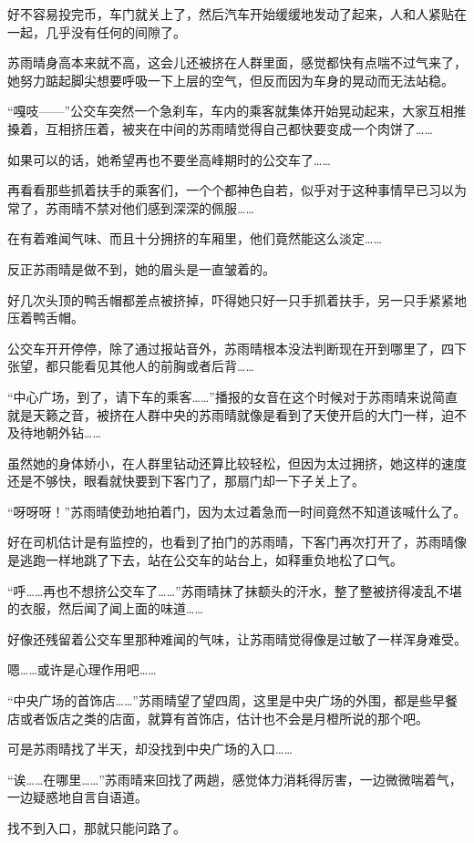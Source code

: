 好不容易投完币，车门就关上了，然后汽车开始缓缓地发动了起来，人和人紧贴在一起，几乎没有任何的间隙了。

苏雨晴身高本来就不高，这会儿还被挤在人群里面，感觉都快有点喘不过气来了，她努力踮起脚尖想要呼吸一下上层的空气，但反而因为车身的晃动而无法站稳。

“嘎吱——”公交车突然一个急刹车，车内的乘客就集体开始晃动起来，大家互相推搡着，互相挤压着，被夹在中间的苏雨晴觉得自己都快要变成一个肉饼了……

如果可以的话，她希望再也不要坐高峰期时的公交车了……

再看看那些抓着扶手的乘客们，一个个都神色自若，似乎对于这种事情早已习以为常了，苏雨晴不禁对他们感到深深的佩服……

在有着难闻气味、而且十分拥挤的车厢里，他们竟然能这么淡定……

反正苏雨晴是做不到，她的眉头是一直皱着的。

好几次头顶的鸭舌帽都差点被挤掉，吓得她只好一只手抓着扶手，另一只手紧紧地压着鸭舌帽。

公交车开开停停，除了通过报站音外，苏雨晴根本没法判断现在开到哪里了，四下张望，都只能看见其他人的前胸或者后背……

“中心广场，到了，请下车的乘客……”播报的女音在这个时候对于苏雨晴来说简直就是天籁之音，被挤在人群中央的苏雨晴就像是看到了天使开启的大门一样，迫不及待地朝外钻……

虽然她的身体娇小，在人群里钻动还算比较轻松，但因为太过拥挤，她这样的速度还是不够快，眼看就快要到下客门了，那扇门却一下子关上了。

“呀呀呀！”苏雨晴使劲地拍着门，因为太过着急而一时间竟然不知道该喊什么了。

好在司机估计是有监控的，也看到了拍门的苏雨晴，下客门再次打开了，苏雨晴像是逃跑一样地跳了下去，站在公交车的站台上，如释重负地松了口气。

“呼……再也不想挤公交车了……”苏雨晴抹了抹额头的汗水，整了整被挤得凌乱不堪的衣服，然后闻了闻上面的味道……

好像还残留着公交车里那种难闻的气味，让苏雨晴觉得像是过敏了一样浑身难受。

嗯……或许是心理作用吧……

“中央广场的首饰店……”苏雨晴望了望四周，这里是中央广场的外围，都是些早餐店或者饭店之类的店面，就算有首饰店，估计也不会是月橙所说的那个吧。

可是苏雨晴找了半天，却没找到中央广场的入口……

“诶……在哪里……”苏雨晴来回找了两趟，感觉体力消耗得厉害，一边微微喘着气，一边疑惑地自言自语道。

找不到入口，那就只能问路了。

